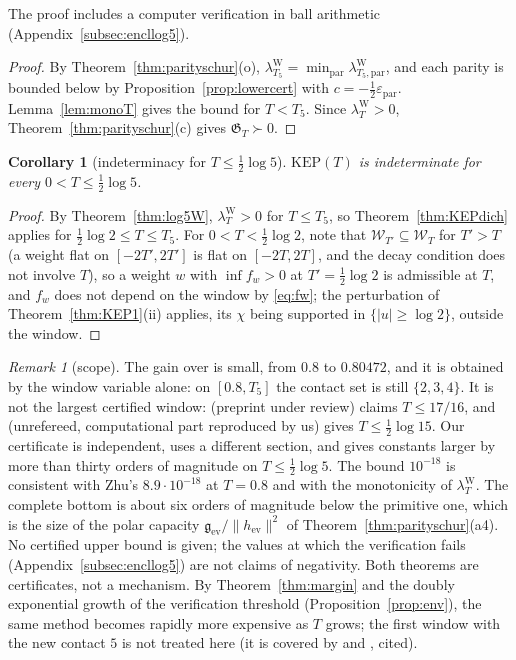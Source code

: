 \documentclass[11pt]{amsart}
\newtheorem{corollary}[theorem]{Corollary}
\theoremstyle{definition}
\theoremstyle{remark}
\newtheorem{remark}[theorem]{Remark}
\newcommand{\lamW}{\lambda^{\mathrm W}_T}
\newcommand{\Wcl}{\mathcal W_T}
\begin{document}
\noindent The proof includes a computer verification in ball arithmetic (Appendix~\ref{subsec:encllog5}).

\begin{proof}
By Theorem~\ref{thm:parityschur}(o), $\lambda^{\mathrm W}_{T_5}=\min_{\mathrm{par}}\lambda^{\mathrm W}_{T_5,\mathrm{par}}$,
and each parity is bounded below by Proposition~\ref{prop:lowercert} with $c=-\frac12\varepsilon_{\mathrm{par}}$.
Lemma~\ref{lem:monoT} gives the bound for $T<T_5$. Since $\lamW>0$, Theorem~\ref{thm:parityschur}(c)
gives $\mathfrak G_T\succ0$.
\end{proof}

\begin{corollary}[indeterminacy for $T\le\frac12\log5$]\label{cor:KEPlog5}
$\mathrm{KEP}(T)$ is indeterminate for every $0<T\le\frac12\log5$.
\end{corollary}
\begin{proof}
By Theorem~\ref{thm:log5W}, $\lamW>0$ for $T\le T_5$, so Theorem~\ref{thm:KEPdich} applies for
$\frac12\log2\le T\le T_5$. For $0<T<\frac12\log2$, note that $\mathcal W_{T'}\subseteq\Wcl$ for $T'>T$ (a weight
flat on $[-2T',2T']$ is flat on $[-2T,2T]$, and the decay condition does not involve $T$), so a weight
$w$ with $\inf f_w>0$ at $T'=\frac12\log2$ is admissible at $T$, and $f_w$ does not depend on the window
by \eqref{eq:fw}; the perturbation of Theorem~\ref{thm:KEP1}(ii) applies, its $\chi$ being supported in
$\{|u|\ge\log2\}$, outside the window.
\end{proof}

\begin{remark}[scope]\label{rem:log5scope}
The gain over \cite[Thm.~1.2]{Zhu2026} is small, from $0.8$ to $0.80472$, and it is obtained by the
window variable alone: on $[0.8,T_5]$ the contact set is still $\{2,3,4\}$. It is not the largest
certified window: \cite{Liu2026} (preprint under review) claims $T\le17/16$, and \cite{Mori15} (unrefereed,
computational part reproduced by us) gives $T\le\frac12\log15$. Our certificate is
independent, uses a different section, and gives constants larger by more than thirty orders of magnitude
on $T\le\frac12\log5$. The bound
$10^{-18}$ is consistent with Zhu's $8.9\cdot10^{-18}$ at $T=0.8$ and with the monotonicity of
$\lamW$. The complete bottom is about six orders of magnitude below the primitive one, which is the
size of the polar capacity $\mathfrak g_{\mathrm{ev}}/\|h_{\mathrm{ev}}\|^2$ of
Theorem~\ref{thm:parityschur}(a4). No certified upper bound is given; the values at which the
verification fails (Appendix~\ref{subsec:encllog5}) are not claims of negativity. Both theorems are
certificates, not a mechanism. By Theorem~\ref{thm:margin} and the doubly exponential growth of the
verification threshold (Proposition~\ref{prop:env}), the same method becomes rapidly more expensive as $T$
grows; the first window with the new contact $5$ is not treated here (it is covered by
\cite[Thm.~B]{Liu2026} and \cite{Mori15}, cited).
\end{remark}
\end{document}
